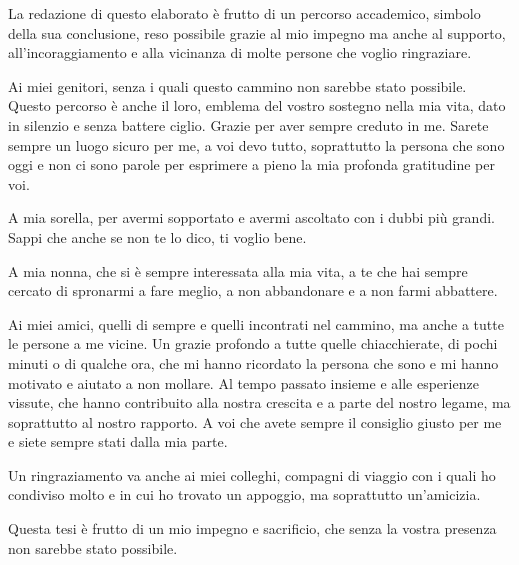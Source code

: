 \begin{acknowledgments}
\large La redazione di questo elaborato è frutto di un percorso accademico, simbolo della sua conclusione, reso possibile grazie al mio impegno ma anche al supporto, all'incoraggiamento e alla vicinanza di molte persone che voglio ringraziare.

\vspace{5mm}

Ai miei genitori, senza i quali questo cammino non sarebbe stato possibile. Questo percorso è anche il loro, emblema del vostro sostegno nella mia vita, dato in silenzio e senza battere ciglio. Grazie per aver sempre creduto in me. Sarete sempre un luogo sicuro per me, a voi devo tutto, soprattutto la persona che sono oggi e non ci sono parole per esprimere a pieno la mia profonda gratitudine per voi.

\vspace{5mm}

A mia sorella, per avermi sopportato e avermi ascoltato con i dubbi più grandi. Sappi che anche se non te lo dico, ti voglio bene.

\vspace{5mm}

A mia nonna, che si è sempre interessata alla mia vita, a te che hai sempre cercato di spronarmi a fare meglio, a non abbandonare e a non farmi abbattere.

\vspace{5mm}

Ai miei amici, quelli di sempre e quelli incontrati nel cammino, ma anche a tutte le persone a me vicine. Un grazie profondo a tutte quelle chiacchierate, di pochi minuti o di qualche ora, che mi hanno ricordato la persona che sono e mi hanno motivato e aiutato a non mollare. Al tempo passato insieme e alle esperienze vissute, che hanno contribuito alla nostra crescita e a parte del nostro legame, ma soprattutto al nostro rapporto. A voi che avete sempre il consiglio giusto per me e siete sempre stati dalla mia parte.

\vspace{5mm}

Un ringraziamento va anche ai miei colleghi, compagni di viaggio con i quali ho condiviso molto e in cui ho trovato un appoggio, ma soprattutto un'amicizia.

\vspace{5mm}

Questa tesi è frutto di un mio impegno e sacrificio, che senza la vostra presenza non sarebbe stato possibile.


\end{acknowledgments}
